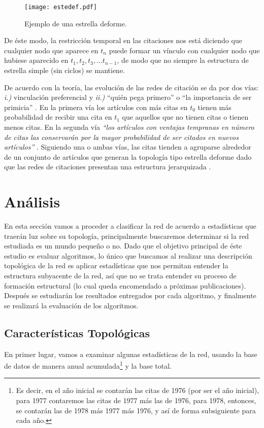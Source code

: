 \documentclass[12pt,letter]{article}
\begin{document}
\begin{figure}[h!]
\centering
\texttt{[image: estedef.pdf]}
\caption{\small{Ejemplo de una estrella deforme.}} \label{estdef}
\end{figure}


\vspace{0.5cm}

De éste modo, la restricción temporal en las citaciones nos está diciendo que cualquier nodo que aparece en $t_{n}$ puede formar un vínculo con cualquier nodo que hubiese aparecido en $t_1, t_2, t_3, ...t_{n-1}$, de modo que no siempre la estructura de estrella simple (sin ciclos) se mantiene.


\vspace{0.5cm}

De acuerdo con la teoría, las evolución de las redes de citación se da por dos vías: \emph{i.)} vinculación preferencial \citep{Barabasi1, SollaPrice} y \emph{ii.)} ``quién pega primero'' o ``la importancia de ser primicia'' \citep{Newman5, Salazar1}. En la primera vía los artículos con más citas en $t_0$ tienen más probabilidad de recibir una cita en $t_1$ que aquellos que no tienen citas o tienen menos citas. En la segunda vía {\it``los artículos con ventajas tempranas en número de citas las conservarán por la mayor probabilidad de ser citados en nuevos artículos''} \citep[pág. 45]{Salazar1}. Siguiendo una o ambas vías, las citas tienden a agruparse alrededor de un conjunto de artículos que generan la topología tipo estrella deforme dado que las redes de citaciones presentan una estructura jerarquizada \citep{Barabasi2, Ravasz}.


\section{Análisis}
En esta sección vamos a proceder a clasificar la red de acuerdo a estadísticas que traerán luz sobre su topología, principalmente buscaremos determinar si la red estudiada es un mundo pequeño o no. Dado que el objetivo principal de éste estudio es evaluar algoritmos, lo único que buscamos al realizar una descripción topológica de la red es aplicar estadísticas que nos permitan entender la estructura subyacente de la red, así que no se trata entender su proceso de formación estructural (lo cual queda encomendado a próximas publicaciones). Después se estudiarán los resultados entregados por cada algoritmo, y finalmente se realizará la evaluación de los algoritmos.

\subsection{Características Topológicas} \label{TopoRed}
En primer lugar, vamos a examinar algunas estadísticas de la red, usando la base de datos de manera anual acumulada\footnote{Es decir, en el año inicial se contarán las citas de 1976 (por ser el año inicial), para 1977 contaremos las citas de 1977 más las de 1976, para 1978, entonces, se contarán las de 1978 más 1977 más 1976, y así de forma subsiguiente para cada año.} y la base total.
\end{document}
